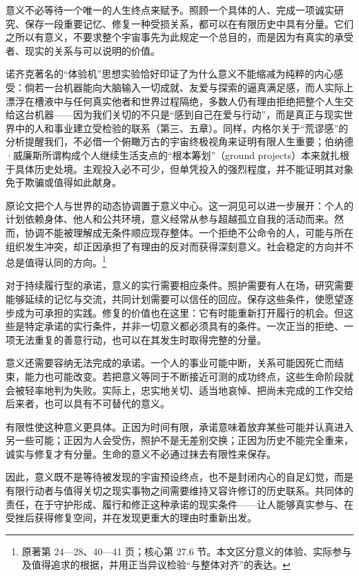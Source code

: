 \documentclass[
  11pt,
  oneside]{book}
\begin{document}
意义不必等待一个唯一的人生终点来赋予。照顾一个具体的人、完成一项诚实研究、保存一段重要记忆、修复一种受损关系，都可以在有限历史中具有分量。它们之所以有意义，不要求整个宇宙事先为此规定一个总目的，而是因为有真实的承受者、现实的关系与可以说明的价值。

诺齐克著名的``体验机''思想实验恰好印证了为什么意义不能缩减为纯粹的内心感受：倘若一台机器能向大脑输入一切成就、友爱与探索的逼真满足感，而人实际上漂浮在槽液中与任何真实他者和世界过程隔绝，多数人仍有理由拒绝把整个人生交给这台机器------因为我们关切的不只是``感到自己在爱与行动''，而是真正与现实世界中的人和事业建立受检验的联系（第三、五章）。同样，内格尔关于``荒谬感''的分析提醒我们，不必借一个俯瞰万古的宇宙终极视角来证明有限人生重要；伯纳德·威廉斯所谓构成个人继续生活支点的``根本筹划''（ground projects）本来就扎根于具体历史处境。主观投入必不可少，但单凭投入的强烈程度，并不能证明其对象免于欺骗或值得如此献身。

原论文把个人与世界的动态协调置于意义中心。这一洞见可以进一步展开：个人的计划依赖身体、他人和公共环境，意义经常从参与超越孤立自我的活动而来。然而，协调不能被理解成无条件顺应现存整体。一个拒绝不公命令的人，可能与所在组织发生冲突，却正因承担了有理由的反对而获得深刻意义。社会稳定的方向并不总是值得认同的方向。\footnote{\hypertarget{ph-note-57}{}原著第 24---28、40---41 页；核心第 27.6 节。本文区分意义的体验、实际参与及值得追求的根据，并用正当异议检验``与整体对齐''的表达。}

对于持续履行型的承诺，意义的实行需要相应条件。照护需要有人在场，研究需要能够延续的记忆与交流，共同计划需要可以信任的回应。保存这些条件，使愿望逐步成为可承担的实践。修复的价值也在这里：它有时能重新打开履行的机会。但这些是特定承诺的实行条件，并非一切意义都必须具有的条件。一次正当的拒绝、一项无法重复的善意行动，也可以在其发生时取得完整的分量。

意义还需要容纳无法完成的承诺。一个人的事业可能中断，关系可能因死亡而结束，能力也可能改变。若把意义等同于不断接近可测的成功终点，这些生命阶段就会被轻率地判为失败。实际上，忠实地关切、适当地哀悼、把尚未完成的工作交给后来者，也可以具有不可替代的意义。

有限性使这种意义更具体。正因为时间有限，承诺意味着放弃某些可能并认真进入另一些可能；正因为人会受伤，照护不是无差别交换；正因为历史不能完全重来，诚实与修复才有分量。生命的意义不必通过抹去有限性来保存。

\begingroup{}

因此，意义既不是等待被发现的宇宙预设终点，也不是封闭内心的自足幻觉，而是有限行动者与值得关切之现实事物之间需要维持又容许修订的历史联系。共同体的责任，在于守护形成、履行和修正这种承诺的现实条件------让人能够真实参与、在受挫后获得修复空间，并在发现更重大的理由时重新出发。
\end{document}
